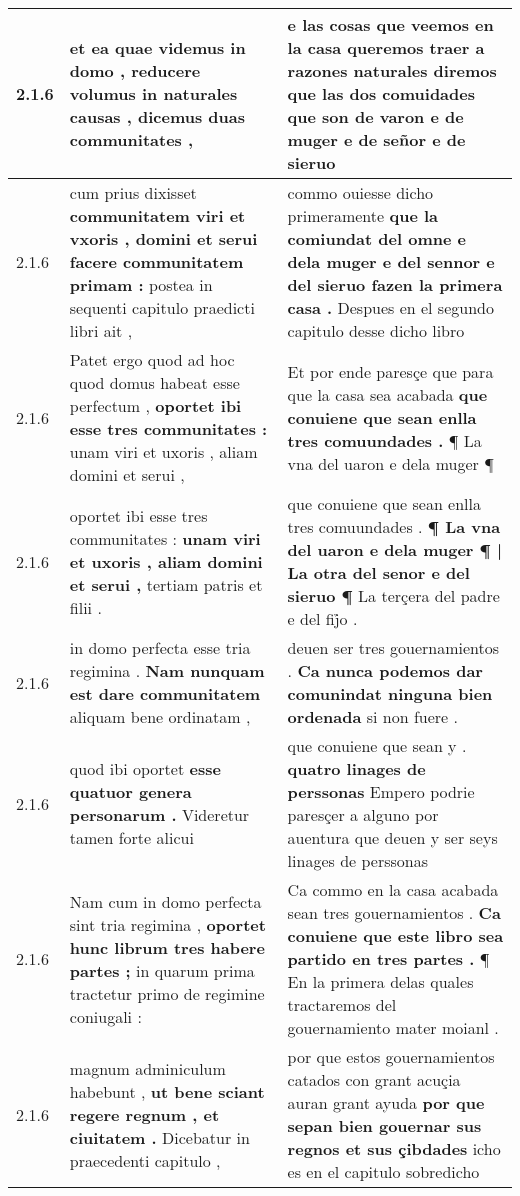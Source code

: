 \begin{tabular}{|p{1cm}|p{6.5cm}|p{6.5cm}|}
2.1.6 & et ea quae videmus in domo , \textbf{ reducere volumus in naturales causas , } dicemus duas communitates , & e las cosas que veemos en la casa queremos traer \textbf{ a razones naturales diremos que las dos comuidades } que son de varon e de muger e de señor e de sieruo \\\hline
2.1.6 & cum prius dixisset \textbf{ communitatem viri et vxoris , domini et serui facere communitatem primam : } postea in sequenti capitulo praedicti libri ait , & commo ouiesse dicho primeramente \textbf{ que la comiundat del omne e dela muger e del sennor e del sieruo fazen la primera casa . } Despues en el segundo capitulo desse dicho libro \\\hline
2.1.6 & Patet ergo quod ad hoc quod domus habeat esse perfectum , \textbf{ oportet ibi esse tres communitates : } unam viri et uxoris , aliam domini et serui , & Et por ende paresçe que para que la casa sea acabada \textbf{ que conuiene que sean enlla tres comuundades . } ¶ La vna del uaron e dela muger ¶ \\\hline
2.1.6 & oportet ibi esse tres communitates : \textbf{ unam viri et uxoris , aliam domini et serui , } tertiam patris et filii . & que conuiene que sean enlla tres comuundades . \textbf{ ¶ La vna del uaron e dela muger ¶ | La otra del senor e del sieruo ¶ } La terçera del padre e del fij̉o . \\\hline
2.1.6 & in domo perfecta esse tria regimina . \textbf{ Nam nunquam est dare communitatem } aliquam bene ordinatam , & deuen ser tres gouernamientos . \textbf{ Ca nunca podemos dar comunindat ninguna bien ordenada } si non fuere . \\\hline
2.1.6 & quod ibi oportet \textbf{ esse quatuor genera personarum . } Videretur tamen forte alicui & que conuiene que sean y . \textbf{ quatro linages de perssonas } Empero podrie paresçer a alguno por auentura que deuen y ser seys linages de perssonas \\\hline
2.1.6 & Nam cum in domo perfecta sint tria regimina , \textbf{ oportet hunc librum tres habere partes ; } in quarum prima tractetur primo de regimine coniugali : & Ca commo en la casa acabada sean tres gouernamientos . \textbf{ Ca conuiene que este libro sea partido en tres partes . } ¶ En la primera delas quales tractaremos del gouernamiento mater moianl . \\\hline
2.1.6 & magnum adminiculum habebunt , \textbf{ ut bene sciant regere regnum , et ciuitatem . } Dicebatur in praecedenti capitulo , & por que estos gouernamientos catados con grant acuçia auran grant ayuda \textbf{ por que sepan bien gouernar sus regnos et sus çibdades } icho es en el capitulo sobredicho \\\hline

\end{tabular}
